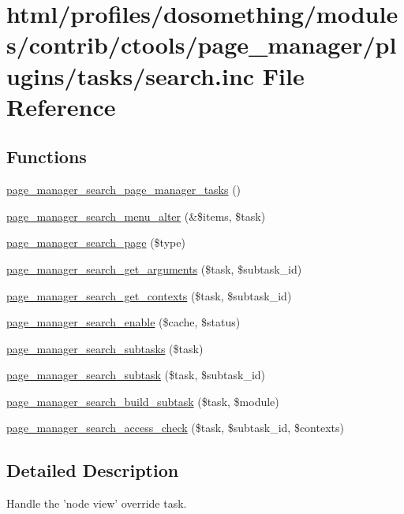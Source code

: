 \hypertarget{search_8inc}{
\section{html/profiles/dosomething/modules/contrib/ctools/page\_\-manager/plugins/tasks/search.inc File Reference}
\label{search_8inc}
}
\subsection*{Functions}
\begin{DoxyCompactItemize}
\item 
\hyperlink{search_8inc_ab3a19319349c19ffc47a5c86576efeee}{page\_\-manager\_\-search\_\-page\_\-manager\_\-tasks} ()
\item 
\hyperlink{search_8inc_a136ff5e3f4fd4aee819affbaf52f0423}{page\_\-manager\_\-search\_\-menu\_\-alter} (\&\$items, \$task)
\item 
\hyperlink{search_8inc_a8ca5b1c88c351db56b4b672edf8f6dc3}{page\_\-manager\_\-search\_\-page} (\$type)
\item 
\hyperlink{search_8inc_a8cd1ec680eb61e9e60fb3c442d835e73}{page\_\-manager\_\-search\_\-get\_\-arguments} (\$task, \$subtask\_\-id)
\item 
\hyperlink{search_8inc_abb94c14f90c4b6e7fe31c190fb101983}{page\_\-manager\_\-search\_\-get\_\-contexts} (\$task, \$subtask\_\-id)
\item 
\hyperlink{search_8inc_acbd77cd58f3bb06e7225d54bdd0dd18e}{page\_\-manager\_\-search\_\-enable} (\$cache, \$status)
\item 
\hyperlink{search_8inc_ac7befb521ac263f9bc2dbe8b9019d615}{page\_\-manager\_\-search\_\-subtasks} (\$task)
\item 
\hyperlink{search_8inc_a38327af8827244b7c5f213421903c51e}{page\_\-manager\_\-search\_\-subtask} (\$task, \$subtask\_\-id)
\item 
\hyperlink{search_8inc_a557ba655c3544df1384c33591a5159f8}{page\_\-manager\_\-search\_\-build\_\-subtask} (\$task, \$module)
\item 
\hyperlink{search_8inc_adde5dbaa1a682f97863333fe038eed4f}{page\_\-manager\_\-search\_\-access\_\-check} (\$task, \$subtask\_\-id, \$contexts)
\end{DoxyCompactItemize}


\subsection{Detailed Description}
Handle the 'node view' override task.

